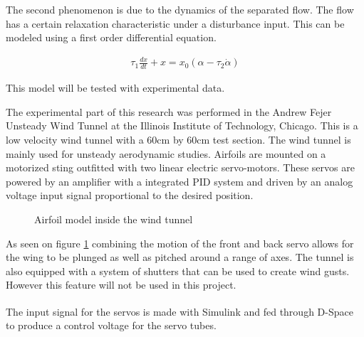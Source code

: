 \par The second phenomenon is due to the dynamics of the separated flow.
The flow has a certain relaxation characteristic under a disturbance input.
This can be modeled using a first order differential equation.

\begin{eqnarray}
  \tau_1 \frac{dx}{dt} +x = x_0(\alpha - \tau_2 \dot{\alpha}) 
  \label{eqn:state_variable}
\end{eqnarray}

This model will be tested with experimental data.


The experimental part of this research was performed in the Andrew Fejer Unsteady Wind Tunnel at the Illinois Institute of Technology, Chicago.
This is a low velocity wind tunnel with a 60cm by 60cm test section.
The wind tunnel is mainly used for unsteady aerodynamic studies.
Airfoils are mounted on a motorized sting outfitted with two linear electric servo-motors.
These servos are powered by an amplifier with a integrated PID system and driven by an analog voltage input signal proportional to the desired position.

\begin{figure}[h]
  \begin{center}
  \end{center}
  \caption{Airfoil model inside the wind tunnel}
  \label{fig:wind_tunnel}
\end{figure}
%
%
As seen on figure \ref{fig:wind_tunnel} combining the motion of the front and back servo allows for the wing to be plunged as well as pitched around a range of axes.
The tunnel is also equipped with a system of shutters that can be used to create wind gusts.
However this feature will not be used in this project.

\par The input signal for the servos is made with Simulink\textsuperscript{\textregistered} and fed through D-Space\textsuperscript{\textregistered} to produce a control voltage for the servo tubes. 

